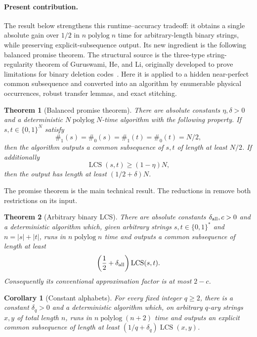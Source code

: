 \documentclass[11pt]{article}
\newtheorem{theorem}{Theorem}[section]
\newtheorem{corollary}[corollary]{Corollary}
\theoremstyle{remark}
\newcommand{\LCS}{\operatorname{LCS}}
\newcommand{\ones}{\#_1}
\newcommand{\zeros}{\#_0}
\newcommand{\polylog}{\operatorname{polylog}}
\begin{document}
\paragraph{Present contribution.}
The result below strengthens this runtime--accuracy tradeoff: it obtains a
single absolute gain over $1/2$ in $n\polylog n$ time for arbitrary-length
binary strings, while preserving explicit-subsequence output.  Its new
ingredient is the following balanced promise theorem.
The structural source is the three-type string-regularity theorem of
Guruswami, He, and Li, originally developed to prove limitations for binary
deletion codes~\cite{GHL}.  Here it is applied to a hidden near-perfect common
subsequence and converted into an algorithm by enumerable physical
occurrences, robust transfer lemmas, and exact stitching.

\begin{theorem}[Balanced promise theorem]\label{thm:balanced}
There are absolute constants $\eta,\delta>0$ and a deterministic
$N\polylog N$-time algorithm with the following property.  If
$s,t\in\{0,1\}^N$ satisfy
\[
 \ones(s)=\zeros(s)=\ones(t)=\zeros(t)=N/2,
\]
then the algorithm outputs a common subsequence of $s,t$ of length at least
$N/2$.  If additionally
\[
 \LCS(s,t)\ge (1-\eta)N,
\]
then the output has length at least $(1/2+\delta)N$.
\end{theorem}

The promise theorem is the main technical result.  The reductions in
 remove both restrictions on its input.

\begin{theorem}[Arbitrary binary LCS]\label{thm:main}
There are absolute constants $\delta_{\rm all},c>0$ and a deterministic
algorithm which, given arbitrary strings $s,t\in\{0,1\}^*$ and
$n=|s|+|t|$, runs in $n\polylog n$ time and outputs a common subsequence
of length at least
\[
  \left(\frac12+\delta_{\rm all}\right)\LCS(s,t).
\]
Consequently its conventional approximation factor is at most $2-c$.
\end{theorem}

\begin{corollary}[Constant alphabets]\label{cor:q-ary}
For every fixed integer $q\ge2$, there is a constant $\delta_q>0$ and a
deterministic algorithm which, on arbitrary $q$-ary strings $x,y$ of total
length $n$, runs in $n\polylog(n+2)$ time and outputs an explicit common
subsequence of length at least $(1/q+\delta_q)\LCS(x,y)$.
\end{corollary}
\end{document}

